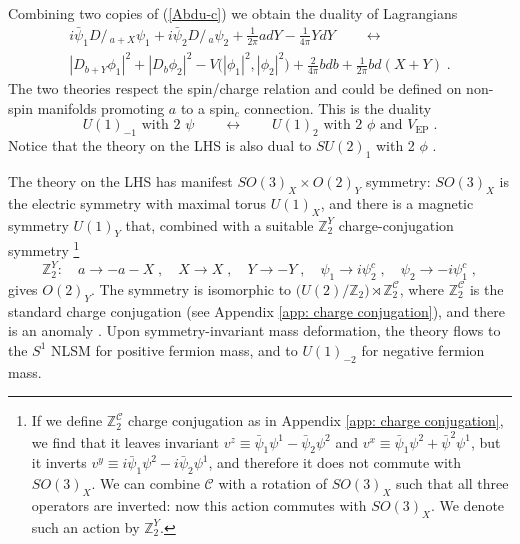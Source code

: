 \documentclass[a4paper, 12pt]{article}
\numberwithin{equation}{section}
\newcommand{\Dslash}{D\!\!\!\!\slash\,}
\newcommand{\be}{\begin{equation}} \newcommand{\ee}{\end{equation}}
\newcommand{\cC}{\mathcal{C}}
\newcommand{\bZ}{\mathbb{Z}}
\begin{document}
Combining two copies of (\ref{Abdu-c}) we obtain the duality of Lagrangians
\begin{multline}
i\bar\psi_1 \Dslash_{a+X} \psi_1 + i \bar\psi_2 \Dslash_a \psi_2 + \frac1{2\pi} adY - \frac1{4\pi} YdY \qquad\longleftrightarrow \\
|D_{b+Y} \phi_1|^2 + |D_b \phi_2|^2 - V\big( |\phi_1|^2, |\phi_2|^2 \big) + \frac2{4\pi} bdb + \frac1{2\pi} bd(X+Y) \;.
\end{multline}
The two theories respect the spin/charge relation and could be defined on non-spin manifolds promoting $a$ to a spin$_c$ connection. This is the duality
\be
\label{duality U(1)2 2 phi}
U(1)_{-1} \text{ with 2 $\psi$} \qquad\longleftrightarrow\qquad U(1)_2 \text{ with 2 $\phi$ and $V_\text{EP}$} \;.
\ee
Notice that the theory on the LHS is also dual to $SU(2)_1$ with 2 $\phi$ \cite{Hsin:2016blu}.

The theory on the LHS has manifest $SO(3)_X \times O(2)_Y$ symmetry: $SO(3)_X$ is the electric symmetry with maximal torus $U(1)_X$, and there is a magnetic symmetry $U(1)_Y$ that, combined with a suitable $\bZ_2^Y$ charge-conjugation symmetry%
\footnote{If we define $\bZ_2^\cC$ charge conjugation as in Appendix \ref{app: charge conjugation}, we find that it leaves invariant $v^z \equiv \bar\psi_1 \psi^1 - \bar\psi_2 \psi^2$ and $v^x \equiv \bar\psi_1 \psi^2 + \bar\psi^2 \psi^1$, but it inverts $v^y \equiv i \bar\psi_1\psi^2 - i \bar\psi_2\psi^1$, and therefore it does not commute with $SO(3)_X$. We can combine $\cC$ with a rotation of $SO(3)_X$ such that all three operators are inverted: now this action commutes with $SO(3)_X$. We denote such an action by $\bZ_2^Y$.}
\be
\bZ_2^Y: \quad a \to -a-X \;,\quad X \to X \;,\quad Y \to -Y \;,\quad \psi_1 \to i \psi_2^c \;,\quad \psi_2 \to -i \psi_1^c \;,
\ee
gives $O(2)_Y$. The symmetry is isomorphic to $\big( U(2)/\bZ_2 \big) \rtimes \bZ_2^\cC$, where $\bZ_2^\cC$ is the standard charge conjugation (see Appendix \ref{app: charge conjugation}), and there is an anomaly \cite{Benini:2017dus}. Upon symmetry-invariant mass deformation, the theory flows to the $S^1$ NLSM for positive fermion mass, and to $U(1)_{-2}$ for negative fermion mass.
\end{document}
